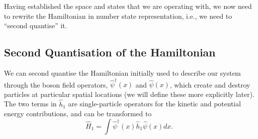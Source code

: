 \documentclass[a4paper,10pt]{article}
\begin{document}
Having established the space and states that we are operating with, we now need to rewrite the Hamiltonian in number state representation, i.e., we need to
``second quantise'' it. 

\subsection{Second Quantisation of the Hamiltonian}
We can second quantise the Hamiltonian initially used to describe our system through the boson field operators, $\hat{\psi}^{\dagger}(x)$ and $\hat{\psi}(x)$, which create and destroy 
particles at particular spatial locations (we will define these more explicitly later). The two terms in $\hat{h}_1$ are single-particle
operators for the kinetic and potential energy contributions, and can be transformed to
\begin{equation}
 \hat{H}_1=\int  \hat{\psi}^{\dagger}(x) \hat{h}_1   \hat{\psi}(x)dx.
\end{equation}
\end{document}

